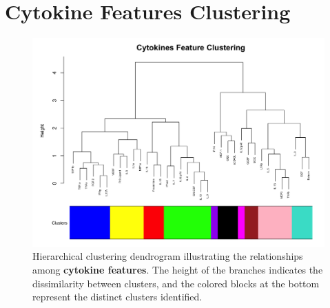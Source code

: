 \documentclass[12pt,a4paper]{report}
\begin{document}
\section{Cytokine Features Clustering}
\label{appendix:cytokine_features_clusterings}

\begin{figure}[H] 
    \centering
    \includegraphics[width=\linewidth]{images/Cytokines_features_clustering_cut_colors.png}
    \caption[Cytokine features clustering dendrogram]{Hierarchical clustering dendrogram illustrating the relationships among \textbf{cytokine features}. The height of the branches indicates the dissimilarity between clusters, and the colored blocks at the bottom represent the distinct clusters identified.}
    \label{fig:Cytokines_features_clustering_cut_colors}
\end{figure}
\end{document}

